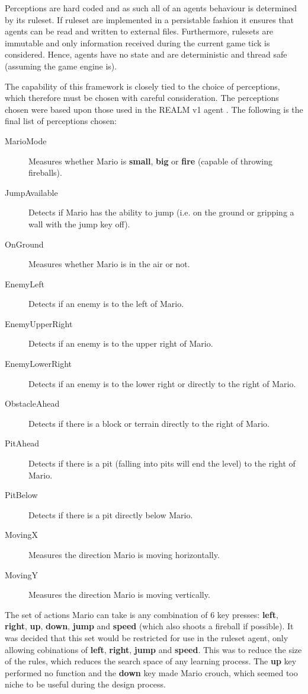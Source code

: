\vspace{\baselineskip}

Perceptions are hard coded and as such all of an agents behaviour is determined by its ruleset. If ruleset are implemented in a persistable fashion it ensures that agents can be read and written to external files. Furthermore, rulesets are immutable and only information received during the current game tick is considered. Hence, agents have no state and are deterministic and thread safe (assuming the game engine is).

The capability of this framework is closely tied to the choice of perceptions, which therefore must be chosen with careful consideration. The perceptions chosen were based upon those used in the REALM v1 agent \cite[p.~85]{realm}. The following is the final list of perceptions chosen:
\begin{description}
\item[MarioMode] Measures whether Mario is \textbf{small}, \textbf{big} or \textbf{fire} (capable of throwing fireballs).
\item[JumpAvailable] Detects if Mario has the ability to jump (i.e. on the ground or gripping a wall with the jump key off).
\item[OnGround] Measures whether Mario is in the air or not.
\item[EnemyLeft] Detects if an enemy is to the left of Mario.
\item[EnemyUpperRight] Detects if an enemy is to the upper right of Mario.
\item[EnemyLowerRight] Detects if an enemy is to the lower right or directly to the right of Mario.
\item[ObstacleAhead] Detects if there is a block or terrain directly to the right of Mario.
\item[PitAhead] Detects if there is a pit (falling into pits will end the level) to the right of Mario.
\item[PitBelow] Detects if there is a pit directly below Mario.
\item[MovingX] Measures the direction Mario is moving horizontally.
\item[MovingY] Measures the direction Mario is moving vertically.
\end{description}

The set of actions Mario can take is any combination of 6 key presses: \textbf{left}, \textbf{right}, \textbf{up}, \textbf{down}, \textbf{jump} and \textbf{speed} (which also shoots a fireball if possible). It was decided that this set would be restricted for use in the ruleset agent, only allowing cobinations of \textbf{left}, \textbf{right}, \textbf{jump} and \textbf{speed}. This was to reduce the size of the rules, which reduces the search space of any learning process. The \textbf{up} key performed no function and the \textbf{down} key made Mario crouch, which seemed too niche to be useful during the design process.


